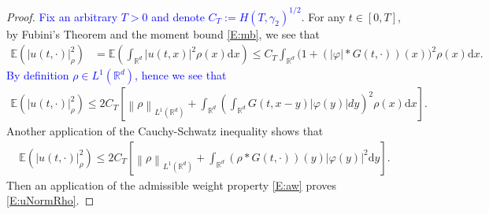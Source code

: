 \documentclass[a4paper,11pt]{article}
\numberwithin{equation}{section}
\theoremstyle{plain}
\theoremstyle{definition}
\newcommand{\R}{\mathbb{R}}
\newcommand{\E}{\mathbb{E}}
\newcommand{\Norm}[1]{\left\|  #1   \right\|}
\newcommand{\ud}{\ensuremath{\mathrm{d}}}
\begin{document}
\begin{proof} 
	\textcolor{blue}{Fix an arbitrary $T>0$ and denote $C_T:=H(T,\gamma_2)^{	1/2}$}. For any $t\in [0,T]$, by Fubini's Theorem and the moment bound \eqref{E:mb}, we see that
	\begin{align*}
		\E\left(| u(t,\cdot)|_\rho^2\right) 
		&= \E \left(\int_{\R^d}\vert u(t,x) \vert^2 \rho(x)\ud x\right) 
		\le C_T \int_{\R^d}\bigg(1+(|\varphi|*G(t,\cdot))(x)\bigg)^2\rho(x)\ud x.
	\end{align*}
	\textcolor{blue}{By definition $\rho\in L^1(\R^d)$, hence we see that} 
	\begin{align}
		\E\left(| u(t,\cdot)|_\rho^2\right) 
		\le 2 C_T \left[ \Norm{\rho}_{L^1(\R^d)} + \int_{\R^d}\left(\int_{\R^d}G(t,x-y)|\varphi(y)|dy\right)^2\rho(x)\ud x\right]. \label{mstep}
	\end{align}
	Another application of the Cauchy-Schwatz inequality shows that 
	\begin{align*}
		\E\left(| u(t,\cdot)|_\rho^2\right) 
		\le 2 C_T \left[ \Norm{\rho}_{L^1(\R^d)} + \int_{\R^d}(\rho*G(t,\cdot))(y)|\varphi(y)|^2\ud y \right].
	\end{align*}
	Then an application of the admissible weight property \eqref{E:aw} proves \eqref{E:uNormRho}.   



\end{proof}
\end{document}

